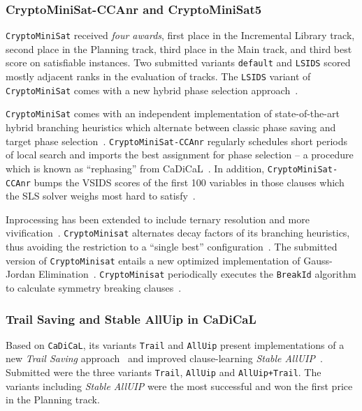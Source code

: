 \documentclass{elsarticle}
\newcommand{\solver}[1]{\texttt{#1}}
\begin{document}
\subsubsection{CryptoMiniSat-CCAnr and CryptoMiniSat5}
\label{sec:cryptominisat}

\solver{CryptoMiniSat} received \emph{four awards}, first place in the Incremental Library track, second place in the Planning track, third place in the Main track, and third best score on satisfiable instances. 
Two submitted variants \solver{default} and \solver{LSIDS} scored mostly adjacent ranks in the evaluation of tracks. 
The \solver{LSIDS} variant of \solver{CryptoMiniSat} comes with a new hybrid phase selection approach~\cite{Shaw:2020:LSIDS,Soos:SC2020}.

\solver{CryptoMiniSat} comes with an independent implementation of state-of-the-art hybrid branching heuristics which alternate between classic phase saving and target phase selection~\cite{Biere:SC2019}.
\solver{CryptoMiniSat-CCAnr} regularly schedules short periods of local search and imports the best assignment for phase selection -- a procedure which is known as ``rephasing'' from CaDiCaL~\cite{Biere:SC2019}.
In addition, \solver{CryptoMiniSat-CCAnr} bumps the VSIDS scores of the first 100 variables in those clauses which the SLS solver weighs most hard to satisfy~\cite{Soos:SC2020}.

Inprocessing has been extended to include ternary resolution and more vivification~\cite{ChuMinLi:2020:Vivification}. 
\solver{CryptoMinisat} alternates decay factors of its branching heuristics, thus avoiding the restriction to a ``single best'' configuration~\cite{Soos:SC2020}. 
The submitted version of \solver{CryptoMinisat} entails a new optimized implementation of Gauss-Jordan Elimination~\cite{Soos:2020:CNFXOR}. 
\solver{CryptoMinisat} periodically executes the \solver{BreakId} algorithm to  calculate symmetry breaking clauses~\cite{Devriendt:2016:BreakId}.


\subsubsection{Trail Saving and Stable AllUip in CaDiCaL}

Based on \solver{CaDiCaL}, its variants \solver{Trail} and \solver{AllUip} present implementations of a new \emph{Trail Saving} approach~\cite{Hickey:2020:TrailSaving} and improved clause-learning \emph{Stable AllUIP}~\cite{Bacchus:SC2020}. 
Submitted were the three variants \solver{Trail}, \solver{AllUip} and \solver{AllUip+Trail}. 
The variants including \emph{Stable AllUIP} were the most successful and won the first price in the Planning track. 
\end{document}

